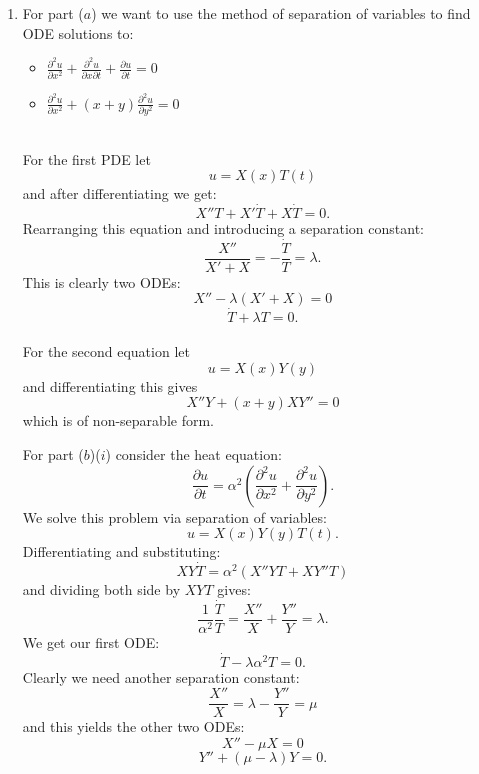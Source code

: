 \pagestyle{fancy}
\fancyhead{}

\begin{enumerate}
    \item For part ($a$) we want to use the method of separation of variables
    to find ODE solutions to:
    \begin{itemize}
        \item $\displaystyle{\frac{\partial^2 u}{\partial x^2}
        +\frac{\partial^2 u}{\partial x\partial t}+\frac{\partial u}{\partial t}=0}$

        \item $\displaystyle{\frac{\partial^2 u}{\partial x^2}
        +(x+y)\frac{\partial^2 u}{\partial y^2}=0}$
    \end{itemize}
    \hspace{0.1in} \\
    
    For the first PDE let
    $$u=X(x)T(t)$$
    and after differentiating we get:
    $$X''T+X'\dot{T}+X\dot{T}=0.$$
    Rearranging this equation and introducing a separation constant:
    $$\frac{X''}{X'+X}=-\frac{\dot{T}}{T}=\lambda.$$
    This is clearly two ODEs:
    $$X''-\lambda(X'+X)=0$$
    $$\dot{T}+\lambda T=0.$$ \\
    
    For the second equation let
    $$u=X(x)Y(y)$$
    and differentiating this gives
    $$X''Y+(x+y)XY''=0$$
    which is of non-separable form.

    \newpage

    For part ($b$)($i$) consider the heat equation:
    $$\frac{\partial u}{\partial t}=\alpha^2
    \left(\frac{\partial^2 u}{\partial x^2}+\frac{\partial^2 u}{\partial y^2}\right).$$
    We solve this problem via separation of variables:
    $$u=X(x)Y(y)T(t).$$
    Differentiating and substituting:
    $$XY\dot{T}=\alpha^2\left(X''YT+XY''T\right)$$
    and dividing both side by $XYT$ gives:
    $$\frac{1}{\alpha^2}\frac{\dot{T}}{T}
    =\frac{X''}{X}+\frac{Y''}{Y}=\lambda.$$
    We get our first ODE:
    $$\dot{T}-\lambda\alpha^2 T=0.$$
    Clearly we need another separation constant:
    $$\frac{X''}{X}=\lambda-\frac{Y''}{Y}=\mu$$
    and this yields the other two ODEs:
    $$X''-\mu X=0$$
    $$Y''+(\mu-\lambda)Y=0.$$

    \newpage


\end{enumerate}
